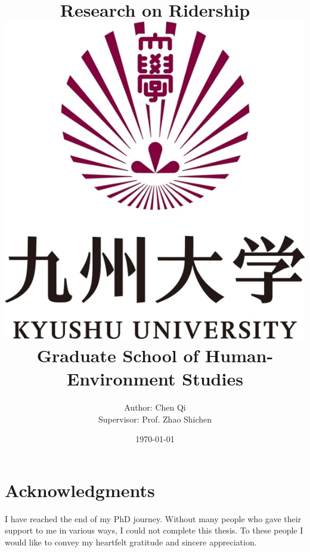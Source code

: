 \documentclass[12pt, twoside, a4paper]{book} %
\begin{document}
\title{
	{Research on Ridership}\\
	{\vspace{2cm}}
	{\includegraphics[scale=0.2]{university.jpg}}\\
	{\vspace{1cm}}
	{\large Graduate School of Human-Environment Studies}\\
	{\vspace{1cm}}
}
\author{
	{Author: Chen Qi}\\
	{Supervisor: Prof. Zhao Shichen}
	{\vspace{1cm}}
}
\date{\today}
\maketitle

\tableofcontents
\frontmatter

\chapter{Acknowledgments}
%
I have reached the end of my PhD journey. Without many people who gave their support to me in various ways, I could not complete this thesis. To these people I would like to convey my heartfelt gratitude and sincere appreciation. 
\end{document}
